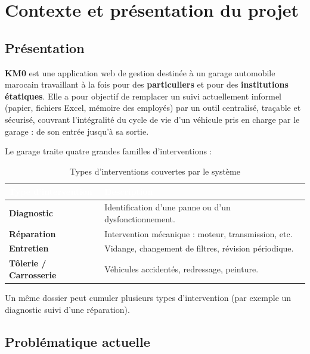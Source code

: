 \documentclass[11pt,a4paper]{report}
\begin{document}
\tableofcontents
\clearpage

\chapter{Contexte et présentation du projet}

\section{Présentation}

\textbf{KM0} est une application web de gestion destinée à un garage automobile marocain
travaillant à la fois pour des \textbf{particuliers} et pour des \textbf{institutions étatiques}.
Elle a pour objectif de remplacer un suivi actuellement informel (papier, fichiers Excel,
mémoire des employés) par un outil centralisé, traçable et sécurisé, couvrant l'intégralité
du cycle de vie d'un véhicule pris en charge par le garage : de son entrée jusqu'à sa sortie.

Le garage traite quatre grandes familles d'interventions :

\begin{table}[h!]
\centering
{}
\begin{tabularx}{\linewidth}{@{}l>{\raggedright\arraybackslash}X@{}}
\toprule
\rowcolor{km0blue}
\textcolor{white}{\textbf{Type d'intervention}} & \textcolor{white}{\textbf{Description}} \\
\midrule
\textbf{Diagnostic} & Identification d'une panne ou d'un dysfonctionnement. \\
\textbf{Réparation} & Intervention mécanique : moteur, transmission, etc. \\
\textbf{Entretien} & Vidange, changement de filtres, révision périodique. \\
\textbf{Tôlerie / Carrosserie} & Véhicules accidentés, redressage, peinture. \\
\bottomrule
\end{tabularx}
\caption{Types d'interventions couvertes par le système}
\end{table}

Un même dossier peut cumuler plusieurs types d'intervention (par exemple un diagnostic
suivi d'une réparation).

\section{Problématique actuelle}
\end{document}
